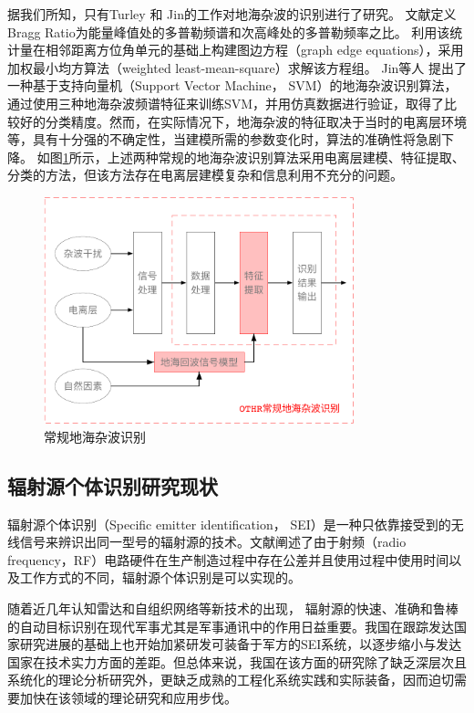 据我们所知，只有Turley 和 Jin的工作对地海杂波的识别进行了研究。
文献\cite{turley2013high}定义Bragg Ratio为能量峰值处的多普勒频谱和次高峰处的多普勒频率之比。
利用该统计量在相邻距离方位角单元的基础上构建图边方程（graph edge equations），采用加权最小均方算法（weighted least-mean-square）求解该方程组。
Jin等人 提出了一种基于支持向量机（Support Vector Machine， SVM）的地海杂波识别算法，通过使用三种地海杂波频谱特征来训练SVM，并用仿真数据进行验证，取得了比较好的分类精度。然而，在实际情况下，地海杂波的特征取决于当时的电离层环境等，具有十分强的不确定性，当建模所需的参数变化时，算法的准确性将急剧下降。
如图\ref{fig:othr_tradition}所示，上述两种常规的地海杂波识别算法采用电离层建模、特征提取、分类的方法，但该方法存在电离层建模复杂和信息利用不充分的问题。
\begin{figure}[hbt]
\centering
\includegraphics[width=9cm]{figures/introduction/othr_tradition}
\caption{常规地海杂波识别}
\label{fig:othr_tradition}
\end{figure}

\subsection{辐射源个体识别研究现状}
辐射源个体识别（Specific emitter identification， SEI）是一种只依靠接受到的无线信号来辨识出同一型号的辐射源的技术。文献\cite{danev2012physical}阐述了由于射频（radio frequency，RF）电路硬件在生产制造过程中存在公差并且使用过程中使用时间以及工作方式的不同，辐射源个体识别是可以实现的。

随着近几年认知雷达和自组织网络等新技术的出现，
辐射源的快速、准确和鲁棒的自动目标识别在现代军事尤其是军事通讯中的作用日益重要。我国在跟踪发达国家研究进展的基础上也开始加紧研发可装备于军方的SEI系统，以逐步缩小与发达国家在技术实力方面的差距。但总体来说，我国在该方面的研究除了缺乏深层次且系统化的理论分析研究外，更缺乏成熟的工程化系统实践和实际装备，因而迫切需要加快在该领域的理论研究和应用步伐。

